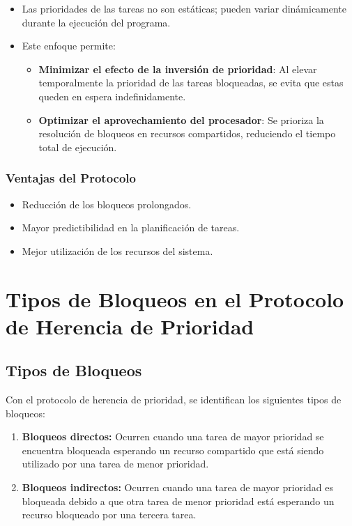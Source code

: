 \documentclass[a4paper,12pt]{article}
\begin{document}
\begin{itemize}
    \item Las prioridades de las tareas no son estáticas; pueden variar dinámicamente durante la ejecución del programa.
    \item Este enfoque permite:
    \begin{itemize}
        \item \textbf{Minimizar el efecto de la inversión de prioridad}: 
        Al elevar temporalmente la prioridad de las tareas bloqueadas, se evita que estas queden en espera indefinidamente.
        \item \textbf{Optimizar el aprovechamiento del procesador}: 
        Se prioriza la resolución de bloqueos en recursos compartidos, reduciendo el tiempo total de ejecución.
    \end{itemize}
\end{itemize}

\subsubsection{Ventajas del Protocolo}

\begin{itemize}
    \item Reducción de los bloqueos prolongados.
    \item Mayor predictibilidad en la planificación de tareas.
    \item Mejor utilización de los recursos del sistema.
\end{itemize}







\section{Tipos de Bloqueos en el Protocolo de Herencia de Prioridad}

\subsection{Tipos de Bloqueos}
Con el protocolo de herencia de prioridad, se identifican los siguientes tipos de bloqueos:
\begin{enumerate}[label=\alph*)]
    \item \textbf{Bloqueos directos:} Ocurren cuando una tarea de mayor prioridad se encuentra bloqueada esperando un recurso compartido que está siendo utilizado por una tarea de menor prioridad.
    \item \textbf{Bloqueos indirectos:} Ocurren cuando una tarea de mayor prioridad es bloqueada debido a que otra tarea de menor prioridad está esperando un recurso bloqueado por una tercera tarea.
\end{enumerate}
\end{document}
